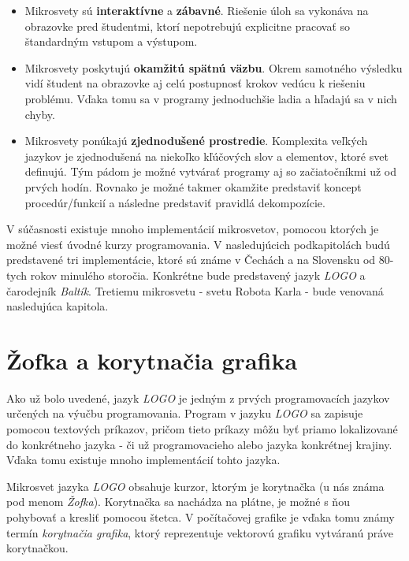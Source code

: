\begin{itemize}
    \item Mikrosvety sú \textbf{interaktívne} a \textbf{zábavné}. Riešenie úloh sa vykonáva na obrazovke pred študentmi, ktorí nepotrebujú explicitne pracovať so štandardným vstupom a výstupom.

    \item Mikrosvety poskytujú \textbf{okamžitú spätnú väzbu}. Okrem samotného výsledku vidí študent na obrazovke aj celú postupnosť krokov vedúcu k riešeniu problému. Vďaka tomu sa v programy jednoduchšie ladia a hľadajú sa v nich chyby.

    \item Mikrosvety ponúkajú \textbf{zjednodušené prostredie}. Komplexita veľkých jazykov je zjednodušená na niekoľko kľúčových slov a elementov, ktoré svet definujú. Tým pádom je možné vytvárať programy aj so začiatočníkmi už od prvých hodín. Rovnako je možné takmer okamžite predstaviť koncept procedúr/funkcií a následne predstaviť pravidlá dekompozície.
\end{itemize}

V súčasnosti existuje mnoho implementácií mikrosvetov, pomocou ktorých je možné viesť úvodné kurzy programovania. V nasledujúcich podkapitolách budú predstavené tri implementácie, ktoré sú známe v Čechách a na Slovensku od 80-tych rokov minulého storočia. Konkrétne bude predstavený jazyk \emph{LOGO} a čarodejník \emph{Baltík}. Tretiemu mikrosvetu - svetu Robota Karla - bude venovaná nasledujúca kapitola.



\section{Žofka a korytnačia grafika}

Ako už bolo uvedené, jazyk \emph{LOGO} je jedným z prvých programovacích jazykov určených na výučbu programovania. Program v jazyku \emph{LOGO} sa zapisuje pomocou textových príkazov, pričom tieto príkazy môžu byť priamo lokalizované do konkrétneho jazyka - či už programovacieho alebo jazyka konkrétnej krajiny. Vďaka tomu existuje mnoho implementácií tohto jazyka.

Mikrosvet jazyka \emph{LOGO} obsahuje kurzor, ktorým je korytnačka (u nás známa pod menom \emph{Žofka}). Korytnačka sa nachádza na plátne, je možné s ňou pohybovať a kresliť pomocou štetca. V počítačovej grafike je vďaka tomu známy termín \emph{korytnačia grafika}, ktorý reprezentuje vektorovú grafiku vytváranú práve korytnačkou.

